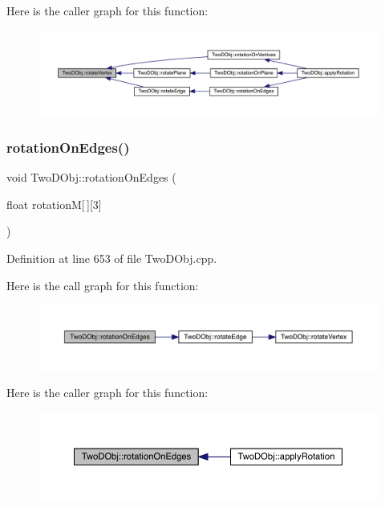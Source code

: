 Here is the caller graph for this function\+:
\nopagebreak
\begin{figure}[H]
\begin{center}
\leavevmode
\includegraphics[width=350pt]{class_two_d_obj_a16583cd47ab05c87310f494ef00e16b7_icgraph}
\end{center}
\end{figure}
\mbox{\label{class_two_d_obj_abbcac0fcfbc8605a16300eb79282ce4f}} 
\subsubsection{\texorpdfstring{rotation\+On\+Edges()}{rotationOnEdges()}}
{\footnotesize\ttfamily void Two\+D\+Obj\+::rotation\+On\+Edges (\begin{DoxyParamCaption}\item[{float}]{rotationM\mbox{[}$\,$\mbox{]}\mbox{[}3\mbox{]} }\end{DoxyParamCaption})}



Definition at line 653 of file Two\+D\+Obj.\+cpp.

Here is the call graph for this function\+:
\nopagebreak
\begin{figure}[H]
\begin{center}
\leavevmode
\includegraphics[width=350pt]{class_two_d_obj_abbcac0fcfbc8605a16300eb79282ce4f_cgraph}
\end{center}
\end{figure}
Here is the caller graph for this function\+:
\nopagebreak
\begin{figure}[H]
\begin{center}
\leavevmode
\includegraphics[width=350pt]{class_two_d_obj_abbcac0fcfbc8605a16300eb79282ce4f_icgraph}
\end{center}
\end{figure}
\mbox{\label{class_two_d_obj_a2627a8f625c1076f4261dd61724be835}} 
